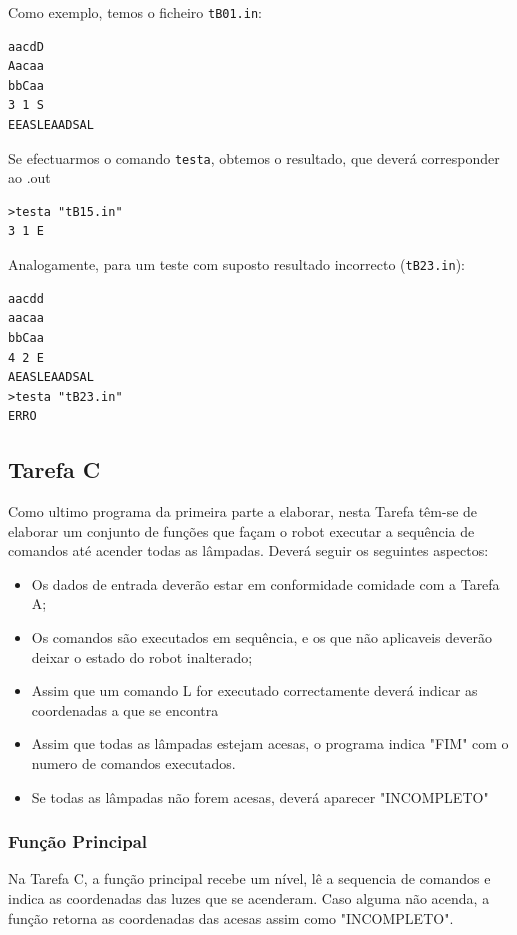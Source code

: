 \documentclass[a4paper]{article}
\begin{document}
Como exemplo, temos o ficheiro \verb|tB01.in|:
\begin{verbatim}
aacdD
Aacaa
bbCaa
3 1 S
EEASLEAADSAL
\end{verbatim}

Se efectuarmos o comando \verb|testa|, obtemos o resultado, que deverá corresponder ao .out
\begin{verbatim}
>testa "tB15.in"
3 1 E
\end{verbatim}


Analogamente, para um teste com suposto resultado incorrecto (\verb|tB23.in|):

\begin{verbatim}
aacdd
aacaa
bbCaa
4 2 E
AEASLEAADSAL
>testa "tB23.in"
ERRO
\end{verbatim}

\break
\subsection{Tarefa C}

Como ultimo programa da primeira parte a elaborar, nesta Tarefa têm-se de elaborar um conjunto de funções que façam o robot executar a sequência de comandos até acender todas as lâmpadas. Deverá seguir os seguintes aspectos:

\begin{itemize}
\item Os dados de entrada deverão estar em conformidade comidade com a Tarefa A;

\item Os comandos são executados em sequência, e os que não aplicaveis deverão deixar o estado do robot inalterado;

\item Assim que um comando L for executado correctamente deverá indicar as coordenadas a que se encontra

\item Assim que todas as lâmpadas estejam acesas, o programa indica "FIM" com o numero de comandos executados.

\item Se todas as lâmpadas não forem acesas, deverá aparecer "INCOMPLETO"
\end{itemize}

\subsubsection{Função Principal}
Na Tarefa C, a função principal recebe um nível, lê a sequencia de comandos e indica as coordenadas das luzes que se acenderam. Caso alguma não acenda, a função retorna as coordenadas das acesas assim como "INCOMPLETO".
\end{document}

